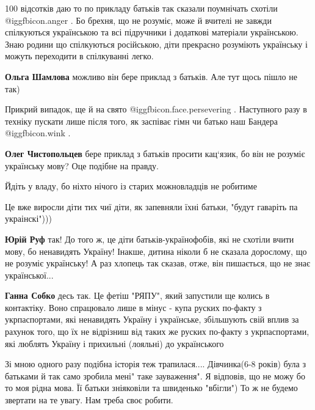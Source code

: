 \begin{itemize}

100 відсотків даю то по прикладу батьків так сказали поумнічать схотіли @igg{fbicon.anger} . Бо
брехня, що не розуміє, може й вчителі не завжди спілкуються українською та всі
підручники і додаткові матеріали українською. Знаю родини що спілкуються
російською, діти прекрасно розуміють українську і можуть переходити в
спілкуванні легко.

\begin{itemize} %
\textbf{Ольга Шамлова} можливо він бере приклад з батьків. Але тут щось пішло не так)

Прикрий випадок, ще й на свято @igg{fbicon.face.persevering} .
Наступного разу в техніку пускати лише після того, як заспіває гімн чи батько наш Бандера  @igg{fbicon.wink} .

\textbf{Олег Чистопольцев} бере приклад з батьків просити кац‘язик, бо він не розуміє українську мову? Оце подібне на правду.
\end{itemize} %

Йдіть у владу, бо ніхто нічого із старих можновладців не робитиме

Це вже виросли діти тих чиї діти, як запевняли їхні батьки, "будут гаваріть па украінскі")))

\begin{itemize} %
\textbf{Юрій Руф} так!
До того ж, це діти батьків-українофобів, які не схотіли вчити мову, бо ненавидять Україну!
Інакше, дитина ніколи б не сказала дорослому, що не розуміє українську!
А раз хлопець так сказав, отже, він пишається, що не знає української...

\textbf{Ганна Собко} десь так. Це фетіш "РЯПУ", який запустили ще колись в контактіку. Воно спрацювало лише в мінус - купа руских по-факту з укрпаспортами, які ненавидять Україну і українське, збільшують свій вплив за рахунок того, що їх не відрізниш від таких же руских по-факту з укрпаспортами, які люблять Україну і прихильні (лояльні) до українського
\end{itemize} %


\obeycr
Зі мною одного разу подібна історія теж трапилася....
Дівчинка(6-8 років) була з батьками й так само зробила мені" таке зауваження".
Я відповів, що не можу бо то моя рідна мова.
Її батьки зніяковіли та швиденько "вбігли")
То ж не будемо звертати на те увагу. Нам треба своє робити.
\restorecr


\end{itemize}
